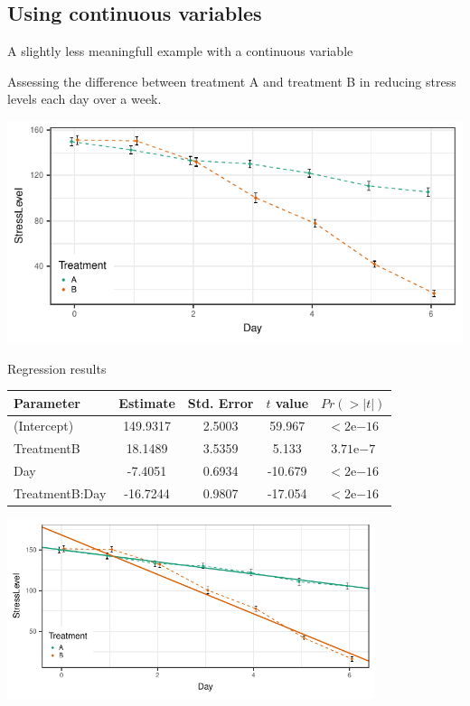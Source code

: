 \documentclass{beamer}
\begin{document}
\subsection{Using continuous variables}

\begin{frame}{A slightly less meaningfull example with a continuous variable}

	\vfill
	Assessing the difference between treatment A and treatment B in reducing stress levels each day over a week.
	\pause
	\vfill
	
	\begin{center}
		\includegraphics{../src/Continuous.pdf}
	\end{center}
	\vfill

\end{frame}

\begin{frame}{Regression results}

	\begin{center}
		\begin{tabular}{lcccc}
		Parameter      & Estimate & Std. Error & $t$ value & $Pr(>|t|)$           \\
		\hline
		(Intercept)    & 149.9317 &     2.5003 &    59.967 & $<2\mathrm{e}{-16}$  \\
		TreatmentB     &  18.1489 &     3.5359 &     5.133 & $3.71\mathrm{e}{-7}$ \\
		Day            &  -7.4051 &     0.6934 &   -10.679 & $<2\mathrm{e}{-16}$  \\
		TreatmentB:Day & -16.7244 &     0.9807 &   -17.054 & $<2\mathrm{e}{-16}$  \\
		\end{tabular}
		
		\includegraphics[height=2.07in]{../src/ContinuousPred.pdf}
	\end{center}

\end{frame}
\end{document}
